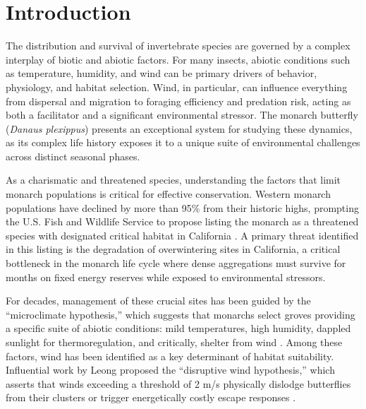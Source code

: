 \usepackage{hyperref}
\usepackage{longtable}

\chapter{Introduction}
\label{ch:introduction}

The distribution and survival of invertebrate species are governed by a complex interplay of biotic and abiotic factors. For many insects, abiotic conditions such as temperature, humidity, and wind can be primary drivers of behavior, physiology, and habitat selection. Wind, in particular, can influence everything from dispersal and migration to foraging efficiency and predation risk, acting as both a facilitator and a significant environmental stressor. The monarch butterfly (\textit{Danaus plexippus}) presents an exceptional system for studying these dynamics, as its complex life history exposes it to a unique suite of environmental challenges across distinct seasonal phases.

As a charismatic and threatened species, understanding the factors that limit monarch populations is critical for effective conservation. Western monarch populations have declined by more than 95\% from their historic highs, prompting the U.S. Fish and Wildlife Service to propose listing the monarch as a threatened species with designated critical habitat in California \citep{usfishEndangeredThreatenedWildlife2024}. A primary threat identified in this listing is the degradation of overwintering sites in California, a critical bottleneck in the monarch life cycle where dense aggregations must survive for months on fixed energy reserves while exposed to environmental stressors.

For decades, management of these crucial sites has been guided by the ``microclimate hypothesis,'' which suggests that monarchs select groves providing a specific suite of abiotic conditions: mild temperatures, high humidity, dappled sunlight for thermoregulation, and critically, shelter from wind \citep{leongMicroenvironmentalFactorsAssociated1990a}. Among these factors, wind has been identified as a key determinant of habitat suitability. Influential work by Leong proposed the ``disruptive wind hypothesis,'' which asserts that winds exceeding a threshold of 2 m/s physically dislodge butterflies from their clusters or trigger energetically costly escape responses \citep{leongEvaluationManagementCalifornia2016}.

